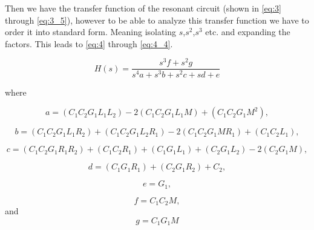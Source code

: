 Then we have the transfer function of the resonant circuit (shown in \cref{eq:3} through \cref{eq:3_5}), however to be able to analyze this transfer function we have to order it into standard form. Meaning isolating $s$,$s^2$,$s^3$ etc. and expanding the factors. This leads to \cref{eq:4} through \cref{eq:4_4}.


\begin{equation} \label{eq:4}
    H(s) = \frac{s^3 f + s^2 g}{s^4 a + s^3 b + s^2 c + s d + e}
\end{equation}

where

\begin{equation} \label{eq:4_1}
    a = (C_1 C_2 G_1 L_1 L_2)-2 (C_1 C_2 G_1 L_1 M)+(C_1 C_2 G_1 M^2),
\end{equation}

\begin{equation} \label{eq:4_2}
    b = (C_1 C_2 G_1 L_1 R_2)+(C_1 C_2 G_1 L_2 R_1)-2 (C_1 C_2 G_1 M R_1)+(C_1 C_2 L_1),
\end{equation}

\begin{equation} \label{eq:4_3}
    c = (C_1 C_2 G_1 R_1 R_2)+(C_1 C_2 R_1)+(C_1 G_1 L_1)+(C_2 G_1 L_2)-2 (C_2 G_1 M),
\end{equation}

\begin{equation} \label{eq:4_4}
    d = (C_1 G_1 R_1)+(C_2 G_1 R_2)+C_2,
\end{equation}

\begin{equation} \label{eq:4_5}
    e = G_1,
\end{equation}

\begin{equation} \label{eq:4_6}
    f = C_1 C_2 M,
\end{equation}
and
\begin{equation} \label{eq:4_7}
    g = C_1 G_1 M
\end{equation}

